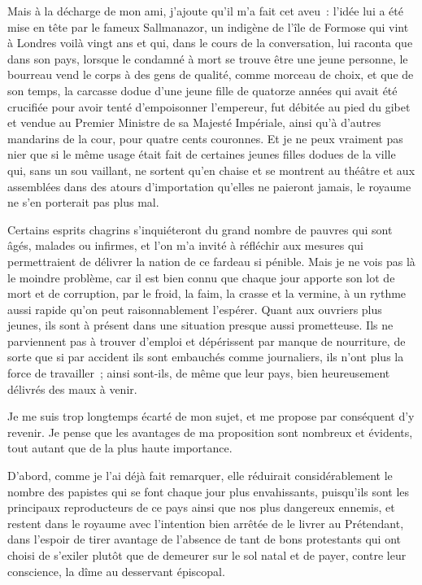 \documentclass[french,twoside]{book} %
\begin{document}
Mais à la décharge de mon ami, j’ajoute qu’il m’a fait cet aveu : l’idée lui a été mise en tête par le fameux Sallmanazor, un indigène de l’île de Formose qui vint à Londres voilà vingt ans et qui, dans le cours de la conversation, lui raconta que dans son pays, lorsque le condamné à mort se trouve être une jeune personne, le bourreau vend le corps à des gens de qualité, comme morceau de choix, et que de son temps, la carcasse dodue d’une jeune fille de quatorze années qui avait été crucifiée pour avoir tenté d’empoisonner l’empereur, fut débitée au pied du gibet et vendue au Premier Ministre de sa Majesté Impériale, ainsi qu’à d’autres mandarins de la cour, pour quatre cents couronnes. Et je ne peux vraiment pas nier que si le même usage était fait de certaines jeunes filles dodues de la ville qui, sans un sou vaillant, ne sortent qu’en chaise et se montrent au théâtre et aux assemblées dans des atours d’importation qu’elles ne paieront jamais, le royaume ne s’en porterait pas plus mal.\par
Certains esprits chagrins s’inquiéteront du grand nombre de pauvres qui sont âgés, malades ou infirmes, et l’on m’a invité à réfléchir aux mesures qui permettraient de délivrer la nation de ce fardeau si pénible. Mais je ne vois pas là le moindre problème, car il est bien connu que chaque jour apporte son lot de mort et de corruption, par le froid, la faim, la crasse et la vermine, à un rythme aussi rapide qu’on peut raisonnablement l’espérer. Quant aux ouvriers plus jeunes, ils sont à présent dans une situation presque aussi prometteuse. Ils ne parviennent pas à trouver d’emploi et dépérissent par manque de nourriture, de sorte que si par accident ils sont embauchés comme journaliers, ils n’ont plus la force de travailler ; ainsi sont-ils, de même que leur pays, bien heureusement délivrés des maux à venir.\par
Je me suis trop longtemps écarté de mon sujet, et me propose par conséquent d’y revenir. Je pense que les avantages de ma proposition sont nombreux et évidents, tout autant que de la plus haute importance.\par
D’abord, comme je l’ai déjà fait remarquer, elle réduirait considérablement le nombre des papistes qui se font chaque jour plus envahissants, puisqu’ils sont les principaux reproducteurs de ce pays ainsi que nos plus dangereux ennemis, et restent dans le royaume avec l’intention bien arrêtée de le livrer au Prétendant, dans l’espoir de tirer avantage de l’absence de tant de bons protestants qui ont choisi de s’exiler plutôt que de demeurer sur le sol natal et de payer, contre leur conscience, la dîme au desservant épiscopal.\par
\end{document}
